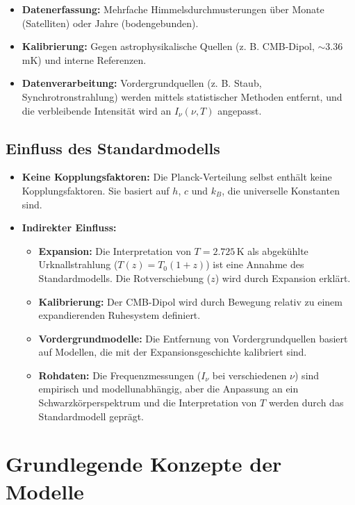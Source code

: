 \documentclass[a4paper,12pt]{article}
\theoremstyle{definition}
\theoremstyle{remark}
\begin{document}
	\begin{itemize}
		\item \textbf{Datenerfassung:} Mehrfache Himmelsdurchmusterungen über Monate (Satelliten) oder Jahre (bodengebunden).
		\item \textbf{Kalibrierung:} Gegen astrophysikalische Quellen (z. B. CMB-Dipol, \(\sim\)3.36 mK) und interne Referenzen.
		\item \textbf{Datenverarbeitung:} Vordergrundquellen (z. B. Staub, Synchrotronstrahlung) werden mittels statistischer Methoden entfernt, und die verbleibende Intensität wird an $I_\nu(\nu, T)$ angepasst.
	\end{itemize}
	
	\subsection{Einfluss des Standardmodells}
	
	\begin{itemize}
		\item \textbf{Keine Kopplungsfaktoren:} Die Planck-Verteilung selbst enthält keine Kopplungsfaktoren. Sie basiert auf $h$, $c$ und $k_B$, die universelle Konstanten sind.
		\item \textbf{Indirekter Einfluss:}
		\begin{itemize}
			\item \textbf{Expansion:} Die Interpretation von $T = 2.725 \, \text{K}$ als abgekühlte Urknallstrahlung ($T(z) = T_0 (1 + z)$) ist eine Annahme des Standardmodells. Die Rotverschiebung ($z$) wird durch Expansion erklärt.
			\item \textbf{Kalibrierung:} Der CMB-Dipol wird durch Bewegung relativ zu einem expandierenden Ruhesystem definiert.
			\item \textbf{Vordergrundmodelle:} Die Entfernung von Vordergrundquellen basiert auf Modellen, die mit der Expansionsgeschichte kalibriert sind.
			\item \textbf{Rohdaten:} Die Frequenzmessungen ($I_\nu$ bei verschiedenen $\nu$) sind empirisch und modellunabhängig, aber die Anpassung an ein Schwarzkörperspektrum und die Interpretation von $T$ werden durch das Standardmodell geprägt.
		\end{itemize}
	\end{itemize}
	
	\section{Grundlegende Konzepte der Modelle}
	
\end{document}
